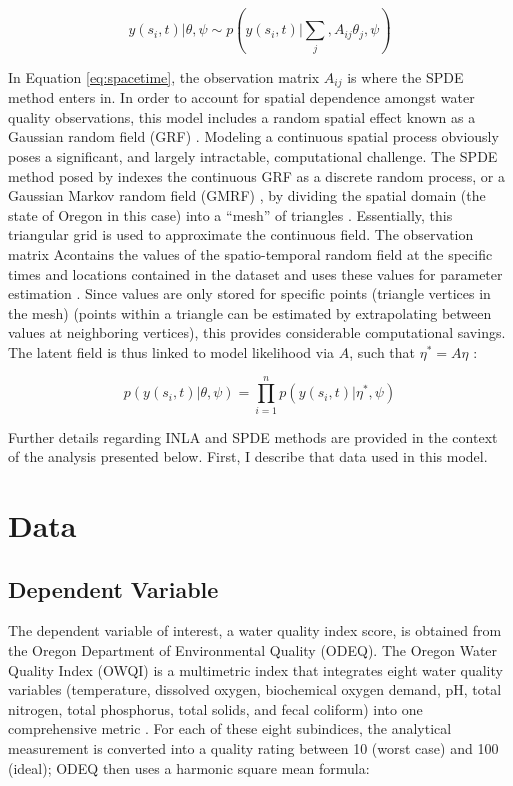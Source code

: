 \documentclass[11pt,a4paper,titlepage]{article}
\begin{document}
\begin{equation}
y(s_i,t)|\theta,\psi \sim p(y(s_i,t)|\sum_j,A_{ij}\theta_{j},\psi)
\label{eq:spacetime}
\end{equation}

In Equation \ref{eq:spacetime}, the observation matrix $A_{ij}$ is where the SPDE method enters in. In order to account for spatial dependence amongst water quality observations, this model includes a random spatial effect known as a Gaussian random field (GRF) \parencite{cosandey-godin2014}. Modeling a continuous spatial process obviously poses a significant, and largely intractable, computational challenge. The SPDE method posed by \textcite{lindgren2011} indexes the continuous GRF as a discrete random process, or a Gaussian Markov random field (GMRF) \parencite{lindgren2013}, by dividing the spatial domain (the state of Oregon in this case) into a “mesh” of triangles \parencite{blangiardo2013}. Essentially, this triangular grid is used to approximate the continuous field. The observation matrix Acontains the values of the spatio-temporal random field at the specific times and locations contained in the dataset and uses these values for parameter estimation \parencite{cosandey-godin2014}. Since values are only stored for specific points (triangle vertices in the mesh) (points within a triangle can be estimated by extrapolating between values at neighboring vertices), this provides considerable computational savings. The latent field is thus linked to model likelihood via $A$, such that $\eta^*=A\eta$ \parencite{cosandey-godin2014}:

\begin{equation}
p(y(s_i,t) | \theta,\psi) = \prod_{i=1}^{n} p(y(s_i,t) | \eta^{*},\psi)
\label{eq:spde}
\end{equation}

Further details regarding INLA and SPDE methods are provided in the context of the analysis presented below. First, I describe that data used in this model. 

\section*{Data}

\subsection*{Dependent Variable}
The dependent variable of interest, a water quality index score, is obtained from the Oregon Department of Environmental Quality (ODEQ). The Oregon Water Quality Index (OWQI) is a multimetric index that integrates eight water quality variables (temperature, dissolved oxygen, biochemical oxygen demand, pH, total nitrogen, total phosphorus, total solids, and fecal coliform) into one comprehensive metric \parencite{cude2001}. For each of these eight subindices, the analytical measurement is converted into a quality rating between 10 (worst case) and 100 (ideal); ODEQ then uses a harmonic square mean formula:
\end{document}
